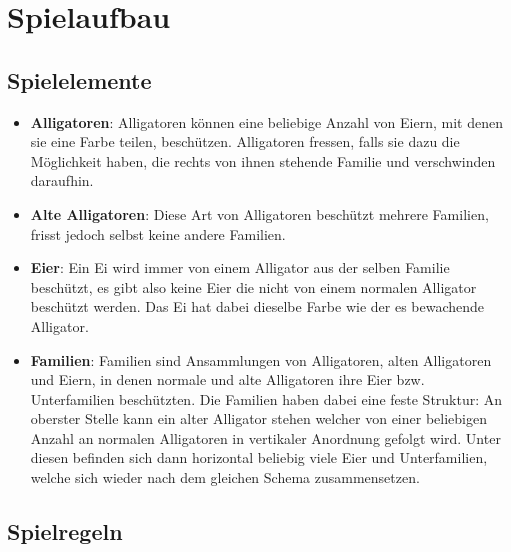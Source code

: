 \section{Spielaufbau}

\subsection{Spielelemente}
	
	\begin{itemize}
	
	\item \textbf{Alligatoren}: Alligatoren können eine beliebige Anzahl von Eiern, mit denen sie eine Farbe teilen, beschützen. Alligatoren fressen, falls sie dazu die Möglichkeit haben, die rechts von ihnen stehende Familie und verschwinden daraufhin.
	
	\item \textbf{Alte Alligatoren}: Diese Art von Alligatoren beschützt mehrere Familien, frisst jedoch selbst keine andere Familien.
	
	\item \textbf{Eier}: Ein Ei wird immer von einem Alligator aus der selben Familie beschützt, es gibt also keine Eier die nicht von einem normalen Alligator beschützt werden. Das Ei hat dabei dieselbe Farbe wie der es bewachende Alligator.
	
	\item \textbf{Familien}: Familien sind Ansammlungen von Alligatoren, alten Alligatoren und Eiern, in denen normale und alte Alligatoren ihre Eier bzw. Unterfamilien beschützten. Die Familien haben dabei eine feste Struktur: An oberster Stelle kann ein alter Alligator stehen welcher von einer beliebigen Anzahl an normalen Alligatoren in vertikaler Anordnung gefolgt wird. Unter diesen befinden sich dann horizontal beliebig viele Eier und Unterfamilien, welche sich wieder nach dem gleichen Schema zusammensetzen.
	
	\end{itemize}	
	
\subsection{Spielregeln}
	
